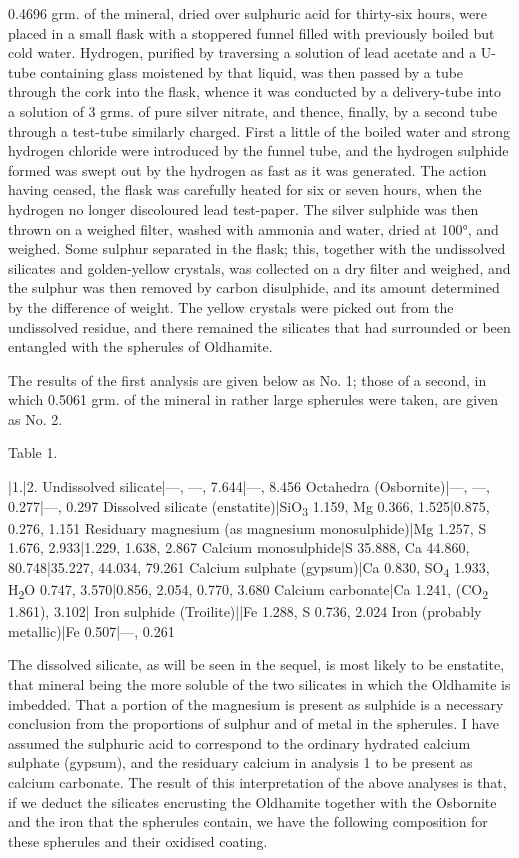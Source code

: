 \documentclass[a4paper, 12pt, oneside]{article}
\begin{document}
0.4696 grm. of the mineral, dried over sulphuric acid for thirty-six hours, were placed in a small flask with a stoppered funnel filled with previously boiled but cold water. Hydrogen, purified by traversing a solution of lead acetate and a U-tube containing glass moistened by that liquid, was then passed by a tube through the cork into the flask, whence it was conducted by a delivery-tube into a solution of 3 grms. of pure silver nitrate, and thence, finally, by a second tube through a test-tube similarly charged. First a little of the boiled water and strong hydrogen chloride were introduced by the funnel tube, and the hydrogen sulphide formed was swept out by the hydrogen as fast as it was generated. The action having ceased, the flask was carefully heated for six or seven hours, when the hydrogen no longer discoloured lead test-paper. The silver sulphide was then thrown on a weighed filter, washed with ammonia and water, dried at 100°, and weighed. Some sulphur separated in the flask; this, together with the undissolved silicates and golden-yellow crystals, was collected on a dry filter and weighed, and the sulphur was then removed by carbon disulphide, and its amount determined by the difference of weight. The yellow crystals were picked out from the undissolved residue, and there remained the silicates that had surrounded or been entangled with the spherules of Oldhamite.

The results of the first analysis are given below as No. 1; those of a second, in which 0.5061 grm. of the mineral in rather large spherules were taken, are given as No. 2.

Table 1.

|1.|2.  
Undissolved silicate|---, ---, 7.644|---, 8.456  
Octahedra (Osbornite)|---, ---, 0.277|---, 0.297  
Dissolved silicate (enstatite)|{SiO\textsubscript{3} 1.159, Mg 0.366}, 1.525|{0.875, 0.276}, 1.151  
Residuary magnesium (as magnesium monosulphide)|{Mg 1.257, S 1.676}, 2.933|{1.229, 1.638}, 2.867  
Calcium monosulphide|{S 35.888, Ca 44.860}, 80.748|{35.227, 44.034}, 79.261  
Calcium sulphate (gypsum)|{Ca 0.830, SO\textsubscript{4} 1.933, H\textsubscript{2}O 0.747}, 3.570|{0.856, 2.054, 0.770}, 3.680  
Calcium carbonate|{Ca 1.241, (CO\textsubscript{2} 1.861)}, 3.102|  
Iron sulphide (Troilite)||{Fe 1.288, S 0.736}, 2.024  
Iron (probably metallic)|{Fe 0.507}|---, 0.261  

The dissolved silicate, as will be seen in the sequel, is most likely to be enstatite, that mineral being the more soluble of the two silicates in which the Oldhamite is imbedded. That a portion of the magnesium is present as sulphide is a necessary conclusion from the proportions of sulphur and of metal in the spherules. I have assumed the sulphuric acid to correspond to the ordinary hydrated calcium sulphate (gypsum), and the residuary calcium in analysis 1 to be present as calcium carbonate. The result of this interpretation of the above analyses is that, if we deduct the silicates encrusting the Oldhamite together with the Osbornite and the iron that the spherules contain, we have the following composition for these spherules and their oxidised coating.
\end{document}
